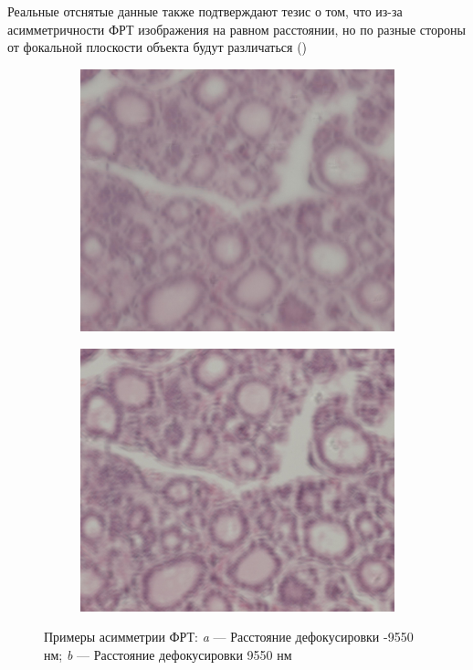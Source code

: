 Реальные отснятые данные также подтверждают тезис о том, что из-за асимметричности ФРТ изображения на равном расстоянии, но по разные стороны от фокальной плоскости объекта будут различаться ()

\begin{figure}[!htbp]
	\begin{subfigure}[t]{0.45\linewidth}
		\centering
		\includegraphics[width=.95\linewidth]{my_folder/images/defocus-9550.jpg}
		\caption{}
		\label{fig:PSF_defocus-9550}
	\end{subfigure}
	\hfill
	\begin{subfigure}[t]{0.45\linewidth}
		\centering
		\includegraphics[width=.95\linewidth]{my_folder/images/defocus9950.jpg}
		\caption{}
		\label{fig:PSF_defocus9550}
	\end{subfigure}
	\caption{Примеры асимметрии ФРТ: {\itshape a} --- Расстояние дефокусировки -9550 нм; {\itshape b} --- Расстояние дефокусировки 9550 нм}
	\label{fig:PSF_example}
\end{figure}

